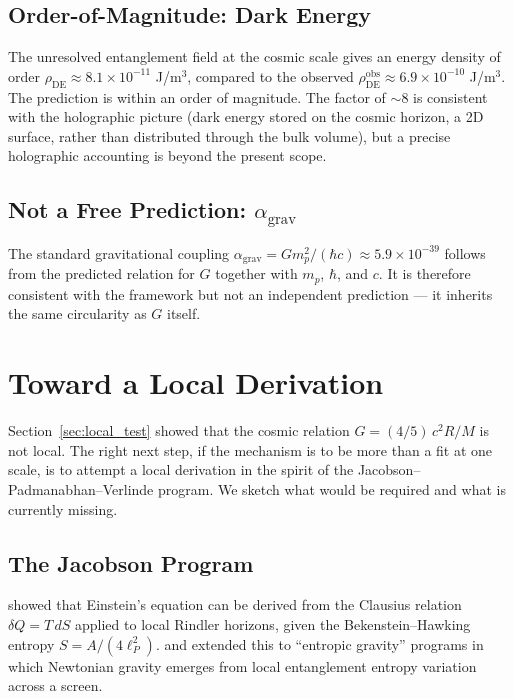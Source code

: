 \documentclass[11pt,letterpaper]{article}
\begin{document}
\subsection{Order-of-Magnitude: Dark Energy}

The unresolved entanglement field at the cosmic scale gives an energy
density of order $\rho_{\mathrm{DE}} \approx 8.1 \times 10^{-11}$ J/m$^3$,
compared to the observed $\rho_{\mathrm{DE}}^{\mathrm{obs}} \approx
6.9 \times 10^{-10}$ J/m$^3$. The prediction is within an order of
magnitude. The factor of $\sim 8$ is consistent with the holographic
picture (dark energy stored on the cosmic horizon, a 2D surface,
rather than distributed through the bulk volume), but a precise
holographic accounting is beyond the present scope.

\subsection{Not a Free Prediction: $\alpha_{\mathrm{grav}}$}

The standard gravitational coupling
$\alpha_{\mathrm{grav}} = G m_p^2/(\hbar c) \approx 5.9 \times 10^{-39}$
follows from the predicted relation for $G$ together with $m_p$, $\hbar$,
and $c$. It is therefore consistent with the framework but not an
independent prediction --- it inherits the same circularity as $G$ itself.

\section{Toward a Local Derivation}
\label{sec:local_derivation}

Section~\ref{sec:local_test} showed that the cosmic relation
$G = (4/5)\, c^2 R/M$ is not local. The right next step, if the
mechanism is to be more than a fit at one scale, is to attempt a
local derivation in the spirit of the Jacobson--Padmanabhan--Verlinde
program. We sketch what would be required and what is currently
missing.

\subsection{The Jacobson Program}

\citet{jacobson1995} showed that Einstein's equation can be derived
from the Clausius relation $\delta Q = T\,dS$ applied to local
Rindler horizons, given the Bekenstein--Hawking entropy
$S = A/(4 \ell_P^2)$. \citet{padmanabhan2010} and \citet{verlinde2011}
extended this to ``entropic gravity'' programs in which Newtonian
gravity emerges from local entanglement entropy variation across a
screen.
\end{document}
